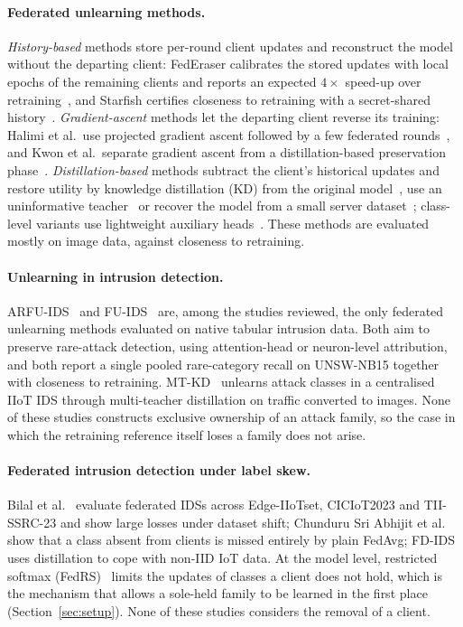 \documentclass[pdflatex,sn-mathphys-num,iicol]{sn-jnl}
\begin{document}
\paragraph{Federated unlearning methods.} \emph{History-based} methods store per-round client updates and reconstruct the model without the departing client: FedEraser calibrates the stored updates with local epochs of the remaining clients and reports an expected $4\times$ speed-up over retraining~\cite{liu2021federaser}, and Starfish certifies closeness to retraining with a secret-shared history~\cite{liu2025starfish}. \emph{Gradient-ascent} methods let the departing client reverse its training: Halimi et al.\ use projected gradient ascent followed by a few federated rounds~\cite{halimi2022}, and Kwon et al.\ separate gradient ascent from a distillation-based preservation phase~\cite{kwon2026}. \emph{Distillation-based} methods subtract the client's historical updates and restore utility by knowledge distillation (KD) from the original model~\cite{wu2022distill}, use an uninformative teacher~\cite{wang2025fedbt} or recover the model from a small server dataset~\cite{zhang2025cgkd}; class-level variants use lightweight auxiliary heads~\cite{patra2026}. These methods are evaluated mostly on image data, against closeness to retraining.

\paragraph{Unlearning in intrusion detection.} ARFU-IDS~\cite{yang2026arfu} and FU-IDS~\cite{wang2026fuids} are, among the studies reviewed, the only federated unlearning methods evaluated on native tabular intrusion data. Both aim to preserve rare-attack detection, using attention-head or neuron-level attribution, and both report a single pooled rare-category recall on UNSW-NB15 together with closeness to retraining. MT-KD~\cite{shen2026mtkd} unlearns attack classes in a centralised IIoT IDS through multi-teacher distillation on traffic converted to images. None of these studies constructs exclusive ownership of an attack family, so the case in which the retraining reference itself loses a family does not arise.

\paragraph{Federated intrusion detection under label skew.} Bilal et al.~\cite{bilal2026} evaluate federated IDSs across Edge-IIoTset, CICIoT2023 and TII-SSRC-23 and show large losses under dataset shift; Chunduru Sri Abhijit et al.~\cite{chunduru2025} show that a class absent from clients is missed entirely by plain FedAvg; FD-IDS~\cite{peng2025fdids} uses distillation to cope with non-IID IoT data. At the model level, restricted softmax (FedRS)~\cite{li2021fedrs} limits the updates of classes a client does not hold, which is the mechanism that allows a sole-held family to be learned in the first place (Section~\ref{sec:setup}). None of these studies considers the removal of a client.
\end{document}
